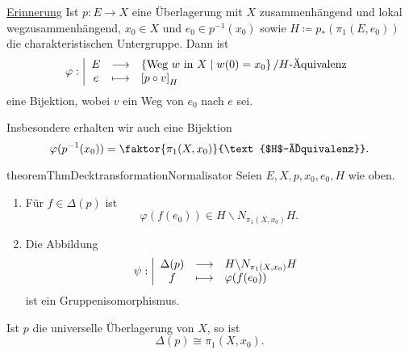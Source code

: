 \underline{Erinnerung} Ist $p\colon  E\to X$ eine Überlagerung mit $X$ zusammenhängend und lokal wegzusammenhängend,  $x_0\in X$ und $e_0\in p^{-1} (x_0)$ sowie $H\coloneqq p_*(\pi_1(E,e_0))$ die charakteristischen Untergruppe. Dann ist
    \begin{equation*}
    \varphi : \left| \begin{array}{c c l} 
        E & \longrightarrow & \left \{\text{Weg $w$ in  $X$}\mid  w(0) = x_0\right\} / \text{$H$-Äquivalenz} \\
e & \longmapsto &  \left[ p \circ  v \right] _H
    \end{array} \right.
\end{equation*}
eine Bijektion, wobei $v$ ein Weg von  $e_0$ nach $e$ sei.

Insbesondere erhalten wir auch eine Bijektion
\[
    \varphi (p^{-1} (x_0)) = \faktor{\pi_1(X,x_0)}{\text{$H$-Äquivalenz}}
.\] 

\begin{restatable}{theorem}{ThmDecktransformationNormalisator}\label{thm:isomorphismus-von-decktransformationen-mit-nebenklassengruppe-von-charakteristischer-untergruppe-in-seinem-normalisator}
    Seien $E,X,p,x_0,e_0,H$ wie oben.
    \begin{enumerate}[1)]
        \item Für $f\in \Delta(p)$ ist
            \[
                \varphi (f(e_0)) \in H \backslash N_{\pi_1(X,x_0)}H
            .\] 
        \item Die Abbildung
                \begin{equation*}
                \psi : \left| \begin{array}{c c l} 
                    \Delta(p) & \longrightarrow & H \backslash N_{\pi_1(X,x_0)}H \\
                    f & \longmapsto &  \varphi (f(e_0))
                \end{array} \right.
            \end{equation*}
           ist ein Gruppenisomorphismus. 
    \end{enumerate}
\end{restatable}

\begin{dcorollary}\label{cor:bei-universeller-überlagerung-sind-decktransformationen-isomorph-zu-fundamentalgruppe}
    Ist $p$ die universelle Überlagerung von  $X$, so ist
    \[
        \Delta(p) \cong \pi_1(X,x_0)
    .\] 
\end{dcorollary}


